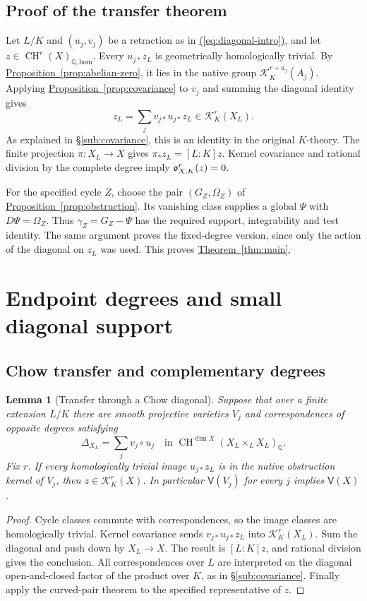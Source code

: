 \documentclass[11pt,a4paper]{article}
\newtheorem{lemma}[theorem]{Lemma}
\theoremstyle{definition}
\theoremstyle{remark}\newtheorem{remark}[theorem]{Remark}
\numberwithin{equation}{section}
\newcommand{\Q}{\mathbb Q}\newcommand{\R}{\mathbb R}\newcommand{\C}{\mathbb C}
\newcommand{\CH}{\operatorname{CH}}\newcommand{\an}{\mathrm{an}}
\newcommand{\homol}{\mathrm{hom}}\newcommand{\BC}{\mathrm{BC}}
\newcommand{\cK}{\mathcal K}\newcommand{\cH}{\mathcal H}
\newcommand{\subref}[1]{\hyperref[#1]{\textcolor{sectionlink}{\S\ref*{#1}}}}
\newcommand{\thmref}[1]{\hyperref[#1]{\textcolor{resultlink}{Theorem~\ref*{#1}}}}
\newcommand{\propref}[1]{\hyperref[#1]{\textcolor{resultlink}{Proposition~\ref*{#1}}}}
\renewcommand{\eqref}[1]{\hyperref[#1]{\textcolor{equationlink}{(\ref*{#1})}}}
\begin{document}
\subsection{Proof of the transfer theorem}\label{proof:main}

Let $L/K$ and $(u_j,v_j)$ be a retraction as in
\eqref{eq:diagonal-intro}, and let $z\in\CH^r(X)_{\Q,\homol}$.
Every $u_{j*}z_L$ is geometrically homologically trivial.
By \propref{prop:abelian-zero}, it lies in the native group
$\mathcal K_K^{r+a_j}(A_j)$. Applying \propref{prop:covariance} to
$v_j$ and summing the diagonal identity gives
\[
               z_L=\sum_jv_{j*}u_{j*}z_L\in\mathcal K_K^r(X_L).
\]
As explained in \subref{sub:covariance}, this is an identity in the
original $K$-theory. The finite projection $\pi:X_L\to X$ gives
$\pi_*z_L=[L:K]z$. Kernel covariance and rational division by the
complete degree imply $\mathfrak o^r_{X,K}(z)=0$.

For the specified cycle $Z$, choose the pair $(G_Z,\Omega_Z)$ of
\propref{prop:obstruction}. Its vanishing class supplies a global
$\Psi$ with $D\Psi=\Omega_Z$. Thus $\gamma_Z=G_Z-\Psi$ has
the required support, integrability and test identity. The same
argument proves the fixed-degree version, since only the action
of the diagonal on $z_L$ was used. This proves \thmref{thm:main}.


\section{Endpoint degrees and small diagonal support}\label{sec:endpoints}

\subsection{Chow transfer and complementary degrees}

\begin{lemma}[Transfer through a Chow diagonal]\label{lem:general-transfer}
Suppose that over a finite extension $L/K$ there are smooth projective
varieties $V_j$ and correspondences of opposite degrees satisfying
\[
 \Delta_{X_L}=\sum_jv_j\circ u_j
 \quad\text{in }\CH^{\dim X}(X_L\times_LX_L)_\Q.
\]
Fix $r$. If every homologically trivial image $u_{j*}z_L$ is in the
native obstruction kernel of $V_j$, then
$z\in\cK_K^r(X)$. In particular $\mathsf V(V_j)$ for every $j$
implies $\mathsf V(X)$.
\end{lemma}

\begin{proof}
Cycle classes commute with correspondences, so the image classes are
homologically trivial. Kernel covariance sends $v_{j*}u_{j*}z_L$ into
$\cK_K^r(X_L)$. Sum the diagonal and push down by $X_L\to X$.
The result is $[L:K]z$, and rational division gives the conclusion.
All correspondences over $L$ are interpreted on the diagonal
open-and-closed factor of the product over $K$, as in
\subref{sub:covariance}. Finally apply the curved-pair theorem to the
specified representative of $z$.
\end{proof}
\end{document}
